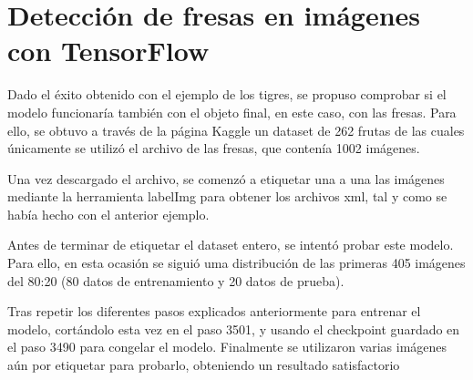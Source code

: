 \section{Detección de fresas en imágenes con TensorFlow}
\label{exp_fresas_Tensorflow}

Dado el éxito obtenido con el ejemplo de los tigres, se propuso comprobar si el modelo funcionaría también con el objeto final, en este caso, con las fresas. Para ello, se obtuvo a través de la página Kaggle un dataset de 262 frutas de las cuales únicamente se utilizó el archivo de las fresas, que contenía 1002 imágenes.

Una vez descargado el archivo, se comenzó a etiquetar una a una las imágenes mediante la herramienta labelImg para obtener los archivos xml, tal y como se había hecho con el anterior ejemplo.

Antes de terminar de etiquetar el dataset entero, se intentó probar este modelo. Para ello, en esta ocasión se siguió uma distribución de las primeras 405 imágenes del 80:20 (80 datos de entrenamiento y 20 datos de prueba).

Tras repetir los diferentes pasos explicados anteriormente para entrenar el modelo, cortándolo esta vez en el paso 3501, y usando el checkpoint guardado en el paso 3490 para congelar el modelo. Finalmente se utilizaron varias imágenes aún por etiquetar para probarlo, obteniendo un resultado satisfactorio


